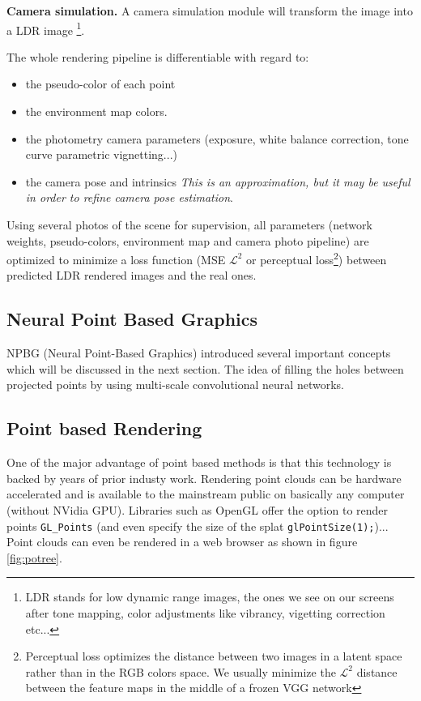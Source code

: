 \noindent\textbf{Camera simulation.} A camera simulation module will transform the image into a LDR image \footnote{LDR stands for low dynamic range images, the ones we see on our screens after tone mapping, color adjustments like vibrancy, vigetting correction etc...}. 

\noindent The whole rendering pipeline is differentiable with regard to:
\begin{itemize}
    \item the pseudo-color of each point
    \item the environment map colors.
    \item the photometry camera parameters (exposure, white balance correction, tone curve parametric vignetting...)
    \item the camera pose and intrinsics \textit{This is an approximation, but it may be useful in order to refine camera pose estimation}. 
\end{itemize}

Using several photos of the scene for supervision, all parameters (network weights, pseudo-colors, environment map and camera photo pipeline) are optimized to minimize a loss function (MSE $\mathcal{L}^{2}$ or perceptual loss\footnote{Perceptual loss \cite{johnson2016perceptual} optimizes the distance between two images in a latent space rather than in the RGB colors space. We usually minimize the $\mathcal{L}^{2}$ distance between the feature maps in the middle of a frozen VGG network}) between predicted LDR rendered images and the real ones. 



\subsection{Neural Point Based Graphics}
\label{subsec:npbg}
NPBG \cite{Aliev2020} (Neural Point-Based Graphics) introduced several important concepts which will be discussed in the next section.
The idea of filling the holes between projected points by using multi-scale convolutional neural networks.  

\subsection{Point based Rendering}
\label{subsec:Point based Rendering}
One of the major advantage of point based methods is that this technology is backed by years of prior industy work. Rendering point clouds can be hardware accelerated and is available to the mainstream public on basically any computer (without NVidia GPU). Libraries such as OpenGL offer the option to render points \texttt{GL\_Points} (and even specify the size of the splat \texttt{glPointSize(1);})... Point clouds can even be rendered in a web browser as shown in figure \ref{fig:potree}.

